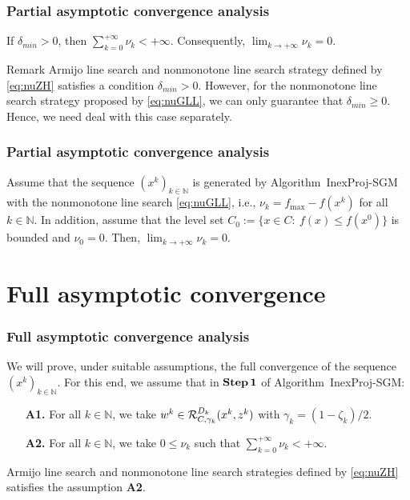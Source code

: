 \begin{frame}[t]\frametitle{Partial asymptotic convergence analysis}
  \begin{proposition}
    If $\delta_{min}>0$,  then  $\displaystyle\sum_{k=0}^{+\infty} \nu_k<+\infty$. Consequently, $\displaystyle\lim_{k\to +\infty} \nu_{k} = 0$.
  \end{proposition}

  \begin{block}{Remark}
    Armijo line search and nonmonotone line search strategy defined by \eqref{eq:nuZH} satisfies  a condition $\delta_{min}>0$.  However,    for  the  nonmonotone line search strategy proposed by \eqref{eq:nuGLL},  we   can only guarantee that $\delta_{min}\geq 0$. Hence,  we need deal with this case separately.
  \end{block}
\end{frame}



\begin{frame}\frametitle{Partial asymptotic convergence analysis}
  \begin{proposition}
    Assume that the sequence  $(x^k)_{k\in\mathbb{N}}$ is generated by Algorithm~InexProj-SGM with the  nonmonotone line  search \eqref{eq:nuGLL}, i.e.,  $\nu_{k}= f_{\max}-f(x^k)$ for all  $k \in \mathbb{N}$. In addition,  assume that the level set $C_{0}:=\{ x\in C: ~ f(x)\leq f(x^0) \}$ is bounded and $\nu_0= 0$.  Then, $\displaystyle\lim_{k\to +\infty} \nu_{k} = 0$.
  \end{proposition}
\end{frame}


\section{Full asymptotic convergence}


\begin{frame}[t]\frametitle{Full asymptotic convergence analysis}
  We will prove, under suitable assumptions, the full convergence of the  sequence $(x^k)_{k\in\mathbb{N}}$.  For this end,  we   assume  that in ${\bf Step\,1}$  of  Algorithm~InexProj-SGM:
  \begin{itemize}
    \item[{\bf A1.}] For all $k \in \mathbb{N}$, we take   $w^k \in   {\cal R}_{C,\gamma_k}^{D_k}(x^{k}, z^k)$   with $\gamma_k=(1-\zeta_k)/2$.
      \item[{\bf A2.}]For all $k \in \mathbb{N}$,  we take  $0\leq \nu_{k}$ such that  $\sum_{k=0}^{+\infty} \nu_k<+\infty$.
  \end{itemize}
  Armijo line search and nonmonotone line search strategies defined by \eqref{eq:nuZH} satisfies  the assumption {\bf A2}. 

\end{frame}


